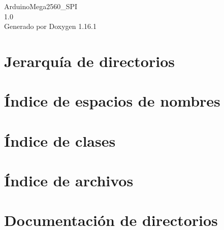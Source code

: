 \documentclass[twoside]{book}
\newcommand{\+}{\discretionary{\mbox{\scriptsize$\hookleftarrow$}}{}{}}
\newcommand{\clearemptydoublepage}{%
    \newpage{\pagestyle{empty}\cleardoublepage}%
  }
\begin{document}
  \raggedbottom
    \hypersetup{pageanchor=false,
                bookmarksnumbered=true,
                pdfencoding=unicode
               }
  \begin{titlepage}
  \vspace*{7cm}
  \begin{center}%
  {\Large Arduino\+Mega2560\+\_\+\+SPI}\\
  [1ex]\large 1.\+0 \\
  \vspace*{1cm}
  {\large Generado por Doxygen 1.16.1}\\
  \end{center}
  \end{titlepage}
  \clearemptydoublepage
  \tableofcontents
  \clearemptydoublepage
  \hypersetup{pageanchor=true}

\chapter{Jerarquía de directorios}

\chapter{Índice de espacios de nombres}

\chapter{Índice de clases}

\chapter{Índice de archivos}

\chapter{Documentación de directorios}





















\end{document}
